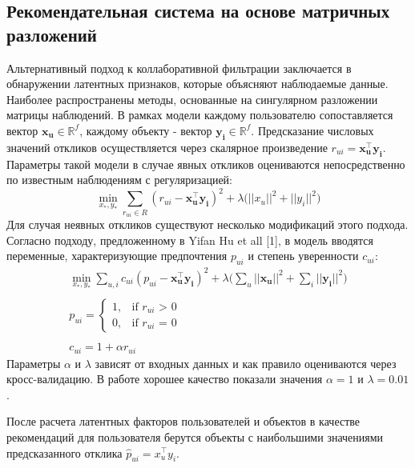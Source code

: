 \documentclass{article}
\begin{document}
\subsection{Рекомендательная система на основе матричных разложений}
Альтернативный подход к коллаборативной фильтрации заключается в обнаружении латентных признаков, которые объясняют наблюдаемые данные. Наиболее распространены методы, основанные на сингулярном разложении матрицы наблюдений. В рамках модели каждому пользователю сопоставляется вектор $\mathbf{x_u} \in  \mathbb{R}^f$, каждому объекту - вектор $\mathbf{y_i} \in  \mathbb{R}^f$. Предсказание числовых значений откликов осуществляется через скалярное произведение $r_{ui} = \mathbf{x_u^\top}\mathbf{y_i}$. Параметры такой модели в случае явных откликов оцениваются непосредственно по известным наблюдениям с регуляризацией:
\begin{equation}
\min_{x_*, y_*} \sum_{r_{ui} \in R} (r_{ui} - \mathbf{x_u^\top}\mathbf{y_i})^2 + \lambda \Big(||x_u||^2 + ||y_i||^2 \Big)
\end{equation}
Для случая неявных откликов существуют несколько модификаций этого подхода. Согласно подходу, предложенному в Yifan Hu et all [1], в модель вводятся переменные, характеризующие предпочтения $p_{ui}$ и степень уверенности $c_{ui}$:
\begin{equation}
\begin{array}{ccl}
\min_{x_*, y_*} \sum_{u, i} c_{ui}(p_{ui} - \mathbf{x_u^\top}\mathbf{y_i})^2 + \lambda \Big(\sum_{u}||\mathbf{x_u}||^2 + \sum_{i}||\mathbf{y_i}||^2 \Big) \\
\\

p_{ui} = \begin{cases} 1, & \mbox{if } r_{ui}\mbox{ > 0} \\ 0, & \mbox{if } r_{ui} \mbox{ = 0} \end{cases}
\\
\\
c_{ui} = 1 + \alpha r_{ui}
\end{array}
\end{equation}
Параметры $\alpha$ и $\lambda$ зависят от входных данных и как правило оцениваются через кросс-валидацию. В работе хорошее качество показали значения $\alpha=1$ и $\lambda = 0.01$. \par
После расчета латентных факторов пользователей и объектов в качестве рекомендаций для пользователя берутся объекты с наибольшими значениями предсказанного отклика $\hat p_{ui} = {x_u^\top}{y_i}$.
\end{document}

